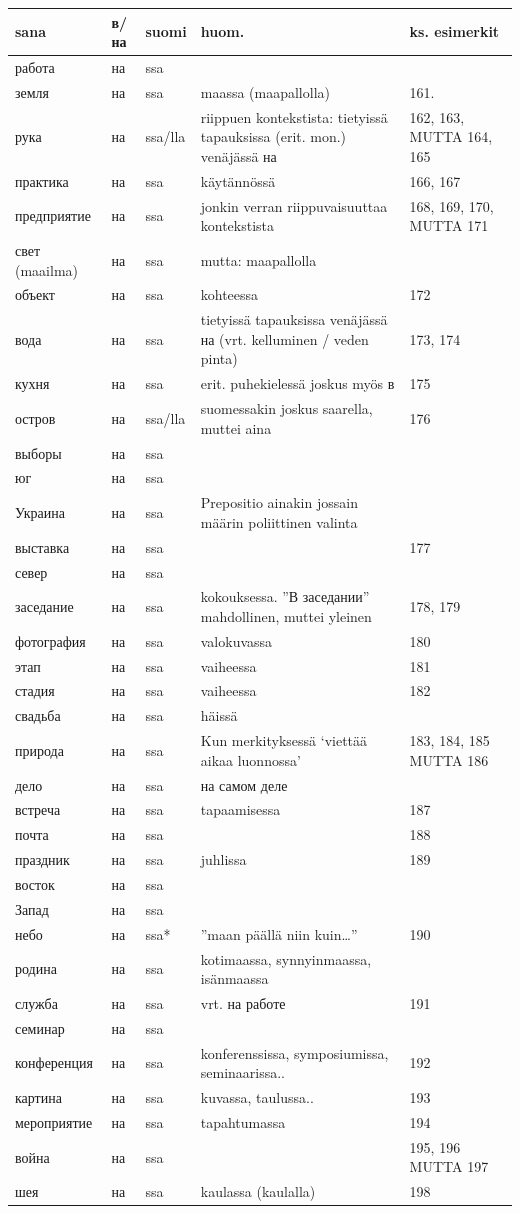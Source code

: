 \documentclass[]{scrreprt}
\begin{document}
\begin{longtable}[c]{@{}lllp{5cm}p{3cm}@{}}
\toprule
sana & в/на & suomi & huom. & ks. esimerkit\tabularnewline
\midrule
\endhead
работа & на & ssa & &\tabularnewline
земля & на & ssa & maassa (maapallolla) & 161.\tabularnewline
рука & на & ssa/lla & riippuen kontekstista: tietyissä tapauksissa
(erit. mon.) venäjässä на & 162, 163, MUTTA 164, 165\tabularnewline
практика & на & ssa & käytännössä & 166, 167\tabularnewline
предприятие & на & ssa & jonkin verran riippuvaisuuttaa kontekstista &
168, 169, 170, MUTTA 171\tabularnewline
свет (maailma) & на & ssa & mutta: maapallolla &\tabularnewline
объект & на & ssa & kohteessa & 172\tabularnewline
вода & на & ssa & tietyissä tapauksissa venäjässä на (vrt. kelluminen /
veden pinta) & 173, 174\tabularnewline
кухня & на & ssa & erit. puhekielessä joskus myös в & 175\tabularnewline
остров & на & ssa/lla & suomessakin joskus saarella, muttei aina &
176\tabularnewline
выборы & на & ssa & &\tabularnewline
юг & на & ssa & &\tabularnewline
Украина & на & ssa & Prepositio ainakin jossain määrin poliittinen
valinta &\tabularnewline
выставка & на & ssa & & 177\tabularnewline
север & на & ssa & &\tabularnewline
заседание & на & ssa & kokouksessa. ''В заседании'' mahdollinen, muttei
yleinen & 178, 179\tabularnewline
фотография & на & ssa & valokuvassa & 180\tabularnewline
этап & на & ssa & vaiheessa & 181\tabularnewline
стадия & на & ssa & vaiheessa & 182\tabularnewline
свадьба & на & ssa & häissä &\tabularnewline
природа & на & ssa & Kun merkityksessä `viettää aikaa luonnossa' & 183,
184, 185 MUTTA 186\tabularnewline
дело & на & ssa & на самом деле &\tabularnewline
встреча & на & ssa & tapaamisessa & 187\tabularnewline
почта & на & ssa & & 188\tabularnewline
праздник & на & ssa & juhlissa & 189\tabularnewline
восток & на & ssa & &\tabularnewline
Запад & на & ssa & &\tabularnewline
небо & на & ssa* & ''maan päällä niin kuin\ldots{}'' &
190\tabularnewline
родина & на & ssa & kotimaassa, synnyinmaassa, isänmaassa
&\tabularnewline
служба & на & ssa & vrt. на работе & 191\tabularnewline
семинар & на & ssa & &\tabularnewline
конференция & на & ssa & konferenssissa, symposiumissa, seminaarissa.. &
192\tabularnewline
картина & на & ssa & kuvassa, taulussa.. & 193\tabularnewline
мероприятие & на & ssa & tapahtumassa & 194\tabularnewline
война & на & ssa & & 195, 196 MUTTA 197\tabularnewline
шея & на & ssa & kaulassa (kaulalla) & 198\tabularnewline
\bottomrule
\end{longtable}
\end{document}
